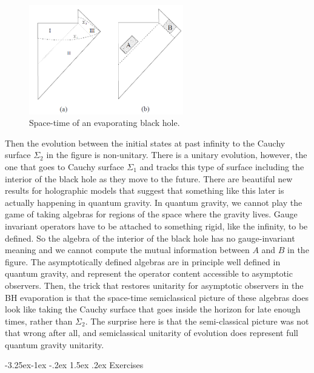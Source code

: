 \documentclass[11pt]{article}
\makeatletter
\renewcommand\subsection{\@startsection{subsection}{2}{\z@}%
                                   {-3.25ex\@plus -1ex \@minus -.2ex}%
                                     {1.5ex \@plus .2ex}%
                                     {\normalfont\bfseries}}
\numberwithin{equation}{section}
\makeatother
\begin{document}
\begin{figure}[t]
\begin{center}  
\includegraphics[width=0.6\textwidth]{imagen2.png}
\captionsetup{width=0.9\textwidth}
\caption{Space-time of an evaporating black hole.}
\label{bibo}
\end{center}  
\end{figure}   


Then the evolution between the initial states at past infinity to the Cauchy surface $\Sigma_2$ in the figure is non-unitary. There is a unitary evolution, however, the one that goes to Cauchy surface $\Sigma_1$ and tracks this type of surface including the interior of the black hole as they move to the future. There are beautiful new results for holographic models that suggest that something like this later is actually happening in quantum gravity. In quantum gravity, we cannot play the game of taking algebras for regions of the space where the gravity lives. Gauge invariant operators have to be attached to something rigid, like the infinity, to be defined. So the algebra of the interior of the black hole has no gauge-invariant meaning and we cannot compute the mutual information between $A$ and $B$ in the figure. The asymptotically defined algebras are in principle well defined in quantum gravity, and represent the operator content accessible to asymptotic observers. Then, the trick that restores unitarity for asymptotic observers in the BH evaporation is that the space-time semiclassical picture of these algebras does look like taking the Cauchy surface that goes inside the horizon for late enough times, rather than $\Sigma_2$. The surprise here is that the semi-classical picture was not that wrong after all, and semiclassical unitarity of evolution does represent full quantum gravity unitarity.      

\subsection{Exercises}
\end{document}
